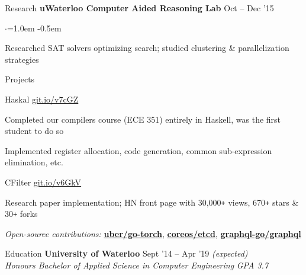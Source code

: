 \documentclass{resume} %
\begin{document}

\begin{rSection}{Research}
  {\bf uWaterloo Computer Aided Reasoning Lab}  \hfill  {Oct -- Dec '15}
    \smallskip
    \begin{list}{$\cdot$}{\leftmargin=1.0em}
    \itemsep -0.5em \vspace{-0.5em}
    \item Researched SAT solvers optimizing search; studied
      clustering \& parallelization strategies
    \end{list}
\end{rSection}


\begin{rSection}{Projects}
  \begin{rSubsection}{Haskal}
                     {\href{https://git.io/v7cGZ}{git.io/v7cGZ}}
                     {}{}
     \item Completed our compilers course (ECE 351) entirely in Haskell, was
       the first student to do so
     \item Implemented register allocation, code generation, common
       sub-expression elimination, etc.
  \end{rSubsection}

  \begin{rSubsection}{CFilter}
    {\href{https://git.io/v6GkV}{git.io/v6GkV}}
                     {}{}
     \item Research paper implementation; HN front page with 30,000\texttt{+}
       views, 670\texttt{+} stars \& 30\texttt{+} forks
  \end{rSubsection}

  \begin{rMinisection}
    \item {\em Open-source contributions:}
      \href{https://github.com/uber/go-torch}{\textbf{uber/go-torch}},
      \href{https://github.com/coreos/etcd}{\textbf{coreos/etcd}},
      \href{https://github.com/graphql-go/graphql}{\textbf{graphql-go/graphql}}
  \end{rMinisection}
\end{rSection}


\begin{rSection}{Education}
  {\bf University of Waterloo} \hfill {Sept '14 -- Apr '19 \em (expected)} \\
  {\em Honours Bachelor of Applied Science in Computer Engineering} \hfill {\em GPA 3.7}
  \vspace{0.5em}
\end{rSection}
\end{document}
